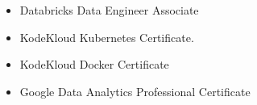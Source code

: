 \begin{itemize}
\item Databricks Data Engineer Associate
\smallskip
\item KodeKloud Kubernetes Certificate.
\smallskip
\item KodeKloud Docker Certificate
\smallskip
\item Google Data Analytics Professional Certificate
\end{itemize}
